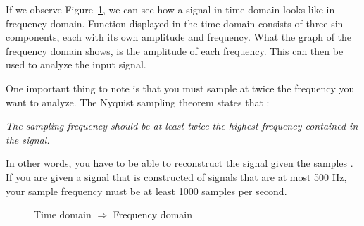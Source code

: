 If we observe Figure~\ref{fig:dft:ex1}, we can see how a signal in time domain looks like in frequency domain. Function displayed in the time domain consists of three sin components, each with its own amplitude and frequency. What the graph of the frequency domain shows, is the amplitude of each frequency. This can then be used to analyze the input signal.

One important thing to note is that you must sample at twice the frequency you want to analyze. The Nyquist sampling theorem states that \cite{signal:aliasing}:
\begin{center}
    \textit{The sampling frequency should be at least twice the highest frequency contained in the signal.}
\end{center}
In other words, you have to be able to reconstruct the signal given the samples \cite[Ch~3]{smith1997scientist}. If you are given a signal that is constructed of signals that are at most 500 Hz, your sample frequency must be at least 1000 samples per second.

\begin{figure}[h]
    \renewcommand\thesubfigure{(\alph{subfigure})}
    \centering
    \caption{Time domain $\Rightarrow$ Frequency domain}
    \label{fig:dft:ex1}
\end{figure}

